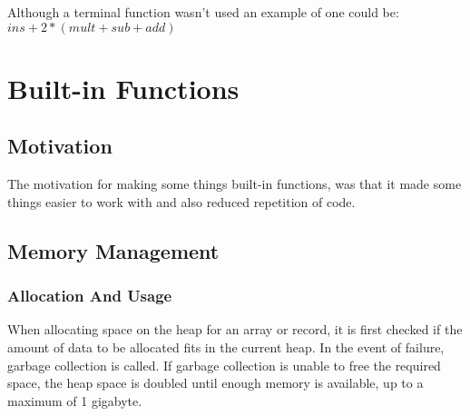 \documentclass{article}
\begin{document}
Although a terminal function wasn't used an example of one could be: \\  $ins + 2 * (mult + sub + add)$




\section{Built-in Functions}

\subsection{Motivation}
The motivation for making some things built-in functions, was that it made some things easier to work with and also reduced repetition of code. 

\subsection{Memory Management}

\subsubsection{Allocation And Usage}
When allocating space on the heap for an array or record, it is first checked if the amount of data to be allocated fits in the current heap. In the event of failure, garbage collection is called. If garbage collection is unable to free the required space, the heap space is doubled until enough memory is available, up to a maximum of 1 gigabyte.
\end{document}
